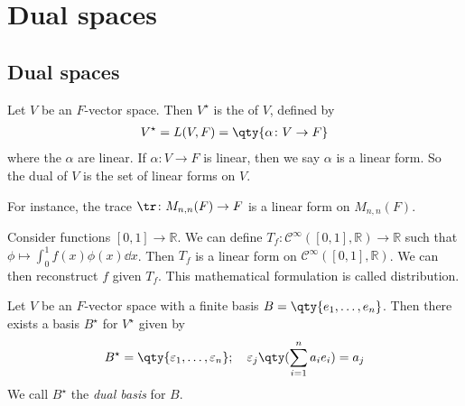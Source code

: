 \section{Dual spaces}

\subsection{Dual spaces}
\begin{definition}
	Let $V$ be an $F$-vector space.
	Then $V^\star$ is the  of $V$, defined by
	\begin{align*}
		V^\star = L(V,F) = \qty{\alpha \colon V \to F}
	\end{align*}
	where the $\alpha$ are linear.
	If $\alpha \colon V \to F$ is linear, then we say $\alpha$ is a linear form.
	So the dual of $V$ is the set of linear forms on $V$.
\end{definition}
\begin{example}
	For instance, the trace $\tr \colon M_{n,n}(F) \to F$ is a linear form on $M_{n,n}(F)$.
\end{example}
\begin{example}
	Consider functions $[0,1] \to \mathbb R$.
	We can define $T_f \colon \mathcal C^\infty([0,1], \mathbb R) \to \mathbb R$ such that $\phi \mapsto \int_0^1 f(x) \phi(x) \dd{x}$.
	Then $T_f$ is a linear form on $\mathcal C^{\infty}([0,1], \mathbb R)$.
	We can then reconstruct $f$ given $T_f$.
	This mathematical formulation is called distribution.
\end{example}
\begin{lemma}
	Let $V$ be an $F$-vector space with a finite basis $B = \qty{e_1, \dots, e_n}$.
	Then there exists a basis $B^\star$ for $V^\star$ given by
	\begin{align*}
		B^\star = \qty{\varepsilon_1, \dots, \varepsilon_n}; \quad \varepsilon_j \qty( \sum_{i=1}^n a_i e_i ) = a_j
	\end{align*}
	We call $B^\star$ the \textit{dual basis} for $B$.
\end{lemma}
